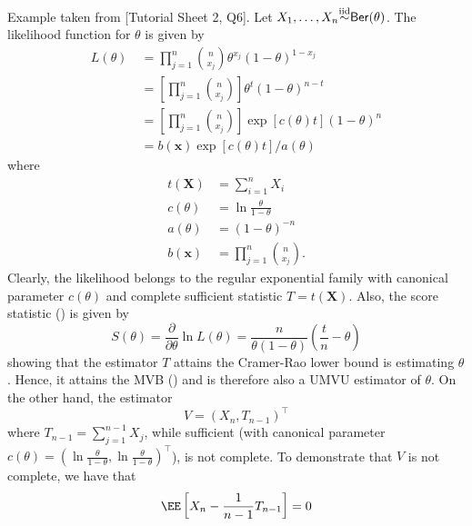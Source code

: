 \begin{exam} \label{exam: sum_ber_rv}
    Example taken from [Tutorial Sheet 2, Q6]. Let $X_1 , \ldots , X_n {\overset{\text{iid}}{\sim}} {\sf Ber} (\theta)$. The likelihood function for $\theta$ is given by
    \begin{align*}
        L (\theta) \
         & = \prod_{j=1}^{n} \binom{n}{x_j} \theta^{x_j} (1-\theta)^{1-x_j}                             \\
         & = \left[ \prod_{j=1}^{n} \binom{n}{x_j} \right] \theta^{t} (1-\theta)^{n - t}                \\
         & = \left[ \prod_{j=1}^{n} \binom{n}{x_j} \right] \exp \left[ c(\theta) t \right] (1-\theta)^n \\
         & = b (\bm{x}) \exp \left[ c(\theta) t \right] / a (\theta)
    \end{align*}
    where
    \begin{align*}
        t (\bm{X}) & = \sum_{i=1}^{n} X_i              \\
        c(\theta)  & = \ln \frac{\theta}{1-\theta}     \\
        a(\theta)  & = (1-\theta)^{-n}                 \\
        b(\bm{x})  & = \prod_{j=1}^{n} \binom{n}{x_j}.
    \end{align*}
    Clearly, the likelihood belongs to the regular exponential family with canonical parameter $c(\theta)$ and complete sufficient statistic $T = t (\bm{X})$. Also, the score statistic () is given by
    \begin{equation*}
        S(\theta) = \frac{\partial}{\partial \theta} \ln L(\theta) = \frac{n}{\theta (1-\theta)} \left( \frac{t}{n} - \theta \right)
    \end{equation*}
    showing that the estimator $T$ attains the Cramer-Rao lower bound is estimating $\theta$. Hence, it attains the MVB () and is therefore also a UMVU estimator of $\theta$. On the other hand, the estimator
    \begin{equation*}
        V = \left( X_n , T_{n-1} \right)^{\intercal}
    \end{equation*}
    where $T_{n-1} = \sum_{j=1}^{n-1} X_j$, while sufficient (with canonical parameter $c(\theta)= (\ln \frac{\theta}{1-\theta} , \ln \frac{\theta}{1-\theta})^{\intercal}$), is not complete. To demonstrate that $V$ is not complete, we have that
    \begin{equation*}
        \EE \left[ X_n - \frac{1}{n-1} T_{n-1} \right] = 0

\end{equation*}
\end{exam}
